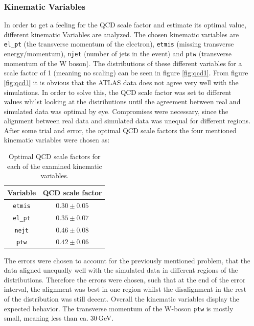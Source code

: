 \subsubsection{Kinematic Variables}
    \label{sec:variables}
    In order to get a feeling for the QCD scale factor and estimate its optimal value, different kinematic Variables are analyzed.
    The chosen kinematic variables are \texttt{el\_pt} (the transverse momentum of the electron), \texttt{etmis} (missing transverse energy/momentum),
    \texttt{njet} (number of jets in the event) and \texttt{ptw} (transverse momentum of the W boson). The distributions of these different variables
    for a scale factor of 1 (meaning no scaling) can be seen in figure \ref{fig:qcd1}. From figure \ref{fig:qcd1} it is obvious that the ATLAS data does not agree very well with 
    the simulations. In order to solve this, the QCD scale factor was set to different values whilst looking at the distributions until the agreement between real and simulated data
    was optimal by eye. Compromises were necessary, since the alignment between real data and simulated data was unequal for different regions. 
    After some trial and error, the optimal QCD scale factors the four mentioned kinematic variables were chosen as:
    \begin{table}[H]
        \centering
        \begin{tabular}{cc}
            \toprule
            Variable & QCD scale factor \\
            \midrule
            \texttt{etmis}   &  $0.30 \pm 0.05$ \\ 
            \texttt{el\_pt}  &  $0.35 \pm 0.07$ \\
            \texttt{nejt}    &  $0.46 \pm 0.08$ \\
            \texttt{ptw}     &  $0.42 \pm 0.06$ \\
            \bottomrule
        \end{tabular}
        \caption{Optimal QCD scale factors for each of the examined kinematic variables.}
        \label{tab:scale_factors}
    \end{table}
    The errors were chosen to account for the previously mentioned problem, that the data aligned unequally well with the simulated data in different regions of the distributions.
    Therefore the errors were chosen, such that at the end of the error interval, the alignment was best in one region whilst the disalignment in the rest of the distribution was
    still decent. 
    Overall the kinematic variables display the expected behavior. The transverse momentum of the W-boson \texttt{ptw} is mostly small, meaning less than ca. 30\,GeV.
